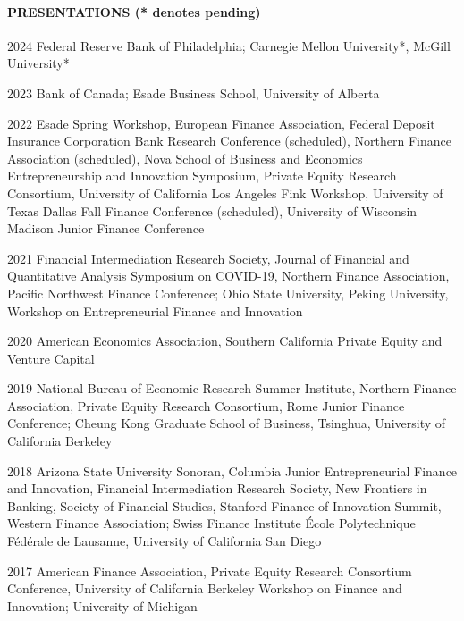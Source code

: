\documentclass[11pt]{article}
\begin{document}
\paragraph{PRESENTATIONS (* denotes pending)}
\begin{datelist}
    \item[2024] Federal Reserve Bank of Philadelphia; Carnegie Mellon University*, McGill University*

    \item[2023] Bank of Canada; Esade Business School, University of Alberta

    \item[2022] Esade Spring Workshop, European Finance Association, Federal Deposit Insurance Corporation Bank Research Conference (scheduled), Northern Finance Association (scheduled), Nova School of Business and Economics Entrepreneurship and Innovation Symposium, Private Equity Research Consortium, University of California Los Angeles Fink Workshop, University of Texas Dallas Fall Finance Conference (scheduled), University of Wisconsin Madison Junior Finance Conference

    \item[2021] Financial Intermediation Research Society, Journal of Financial and Quantitative Analysis Symposium on COVID-19, Northern Finance Association, Pacific Northwest Finance Conference; Ohio State University, Peking University, Workshop on Entrepreneurial Finance and Innovation

    \item[2020] American Economics Association, Southern California Private Equity and Venture Capital

    \item[2019] National Bureau of Economic Research Summer Institute, Northern Finance Association, Private Equity Research Consortium, Rome Junior Finance Conference; Cheung Kong Graduate School of Business, Tsinghua, University of California Berkeley

    \item[2018] Arizona State University Sonoran, Columbia Junior Entrepreneurial Finance and Innovation, Financial Intermediation Research Society, New Frontiers in Banking, Society of Financial Studies, Stanford Finance of Innovation Summit, Western Finance Association; Swiss Finance Institute École Polytechnique Fédérale de Lausanne, University of California San Diego

    \item[2017] American Finance Association, Private Equity Research Consortium Conference, University of California Berkeley Workshop on Finance and Innovation; University of Michigan


\end{datelist}
\end{document}
